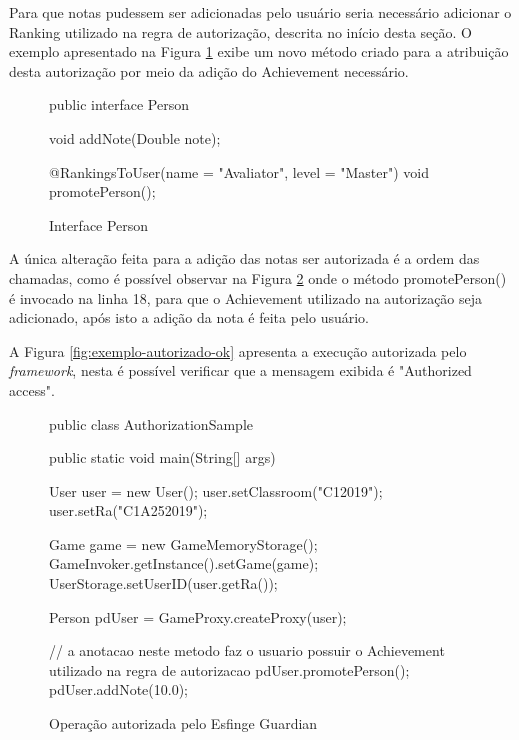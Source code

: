 \par Para que notas pudessem ser adicionadas pelo usuário seria necessário adicionar o Ranking utilizado na regra de autorização, descrita no início desta seção. O exemplo apresentado na Figura \ref{fig:autorizacao-ok} exibe um novo método criado para a atribuição desta autorização por meio da adição do Achievement necessário.

\begin{figure}[H]
    \centering
    \caption{Interface Person}
    \begin{java}
public interface Person {

	void addNote(Double note);

	@RankingsToUser(name = "Avaliator", level = "Master")
	void promotePerson();
}
    \end{java}
    \label{fig:autorizacao-ok}
\end{figure}

\par A única alteração feita para a adição das notas ser autorizada é a ordem das chamadas, como é possível observar na Figura \ref{fig:hellow-world-gamification-autorizada} onde o método promotePerson() é invocado na linha 18, para que o Achievement utilizado na autorização seja adicionado, após isto a adição da nota é feita pelo usuário.

\par A Figura \ref{fig:exemplo-autorizado-ok} apresenta a execução autorizada pelo \textit{framework}, nesta é possível verificar que a mensagem exibida é "Authorized access".

\begin{figure}[H]
    \centering
    \caption{Operação autorizada pelo Esfinge Guardian}
    \begin{java}
public class AuthorizationSample {

	public static void main(String[] args) {

		User user = new User();
		user.setClassroom("C12019");
		user.setRa("C1A252019");
		
		Game game = new GameMemoryStorage();
    	         GameInvoker.getInstance().setGame(game);
		UserStorage.setUserID(user.getRa());

		Person pdUser = GameProxy.createProxy(user);
		
		// a anotacao neste metodo faz o usuario possuir o Achievement utilizado na regra de autorizacao
		pdUser.promotePerson();
		pdUser.addNote(10.0);

	}
}
    \end{java}
    \label{fig:hellow-world-gamification-autorizada}
\end{figure}


